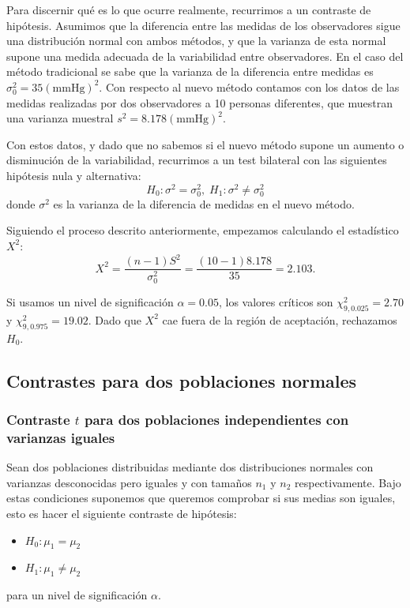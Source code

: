 \documentclass[a4paper,12pt]{article}
\begin{document}
    Para discernir qué es lo que ocurre realmente, recurrimos a un contraste de hipótesis. 
    Asumimos que la diferencia entre las medidas de los observadores sigue una distribución normal con ambos métodos, y que la varianza de esta normal supone una medida adecuada de la variabilidad entre observadores.
    En el caso del método tradicional se sabe que la varianza de la diferencia entre medidas es $\sigma_0^2=35 (\textrm{mmHg})^2$.
    Con respecto al nuevo método contamos con los datos de las medidas realizadas por dos observadores a 10 personas diferentes, que muestran una varianza muestral $s^2 = 8.178 (\textrm{mmHg})^2$.

    Con estos datos, y dado que no sabemos si el nuevo método supone un aumento o disminución de la variabilidad, recurrimos a un test bilateral con las siguientes hipótesis nula y alternativa:
    \begin{equation}
        H_0 : \sigma^2 = \sigma_0^2, \;
        H_1 : \sigma^2 \neq \sigma_0^2
    \end{equation}
    donde $\sigma^2$ es la varianza de la diferencia de medidas en el nuevo método.

    Siguiendo el proceso descrito anteriormente, empezamos calculando el estadístico $X^2$:
    \begin{equation}
        X^2
        =
        \frac{(n-1)S^2}{\sigma_0^2}
        =
        \frac{(10 - 1) 8.178}{35}
        =
        2.103
        .
    \end{equation}

    Si usamos un nivel de significación $\alpha = 0.05$, los valores críticos son $\chi^2_{9, 0.025} = 2.70$ y $\chi^2_{9,0.975} = 19.02$. 
    Dado que $X^2$ cae fuera de la región de aceptación, rechazamos $H_0$.



\subsection{Contrastes para dos poblaciones normales}

\subsubsection{Contraste $t$ para dos poblaciones independientes con varianzas iguales}
\label{sec:t_2samplessamevar}

    Sean dos poblaciones distribuidas mediante dos distribuciones normales con varianzas desconocidas pero iguales y con tamaños $n_1$ y $n_2$ respectivamente.
    Bajo estas condiciones suponemos que queremos comprobar si sus medias son iguales, esto es hacer el siguiente contraste de hipótesis:
\begin{itemize}
	\item $H_0:\mu_1=\mu_2$
	\item $H_1:\mu_1\neq \mu_2$
\end{itemize}
para un nivel de significación $\alpha$.
\end{document}
